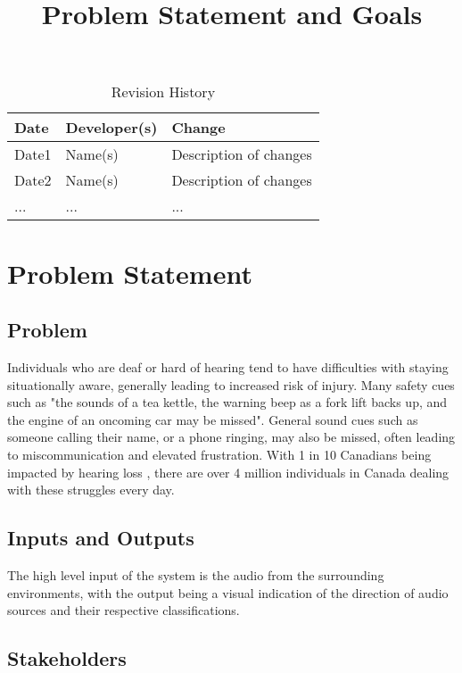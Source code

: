 \documentclass{article}
\title{Problem Statement and Goals\\\progname}
\author{\authname}
\date{}
\begin{document}
\maketitle

\begin{table}[hp]
\caption{Revision History} \label{TblRevisionHistory}
\begin{tabularx}{\textwidth}{llX}
\toprule
\textbf{Date} & \textbf{Developer(s)} & \textbf{Change}\\
\midrule
Date1 & Name(s) & Description of changes\\
Date2 & Name(s) & Description of changes\\
... & ... & ...\\
\bottomrule
\end{tabularx}
\end{table}

\section{Problem Statement}

\subsection{Problem}

Individuals who are deaf or hard of hearing tend to have difficulties with
staying situationally aware, generally leading to increased risk of injury. Many
safety cues such as "the sounds of a tea kettle, the warning beep as a fork lift
backs up, and the engine of an oncoming car may be missed". \cite{Masterson2016}
General sound cues such as someone calling their name, or a phone ringing, may
also be missed, often leading to miscommunication and elevated frustration. With
1 in 10 Canadians being impacted by hearing loss \cite{Healthing2025}, there are
over 4 million individuals in Canada dealing with these struggles every day.


\subsection{Inputs and Outputs}

The high level input of the system is the audio from the surrounding
environments, with the output being a visual indication of the direction of
audio sources and their respective classifications.

\subsection{Stakeholders}
\end{document}
